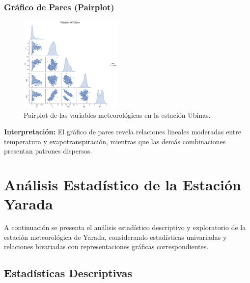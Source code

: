 \subsubsection*{Gráfico de Pares (Pairplot)}
\begin{figure}[H]
\centering
\includegraphics[width=0.45\textwidth]{resultados/por_estacion_meteorologica/Ubinas/pairplot.png}
\caption{Pairplot de las variables meteorológicas en la estación Ubinas.}
\label{fig:ubinas_pairplot}
\end{figure}
\textbf{Interpretación:} El gráfico de pares revela relaciones lineales moderadas entre temperatura y evapotranspiración, mientras que las demás combinaciones presentan patrones dispersos.


\section{Análisis Estadístico de la Estación Yarada}

A continuación se presenta el análisis estadístico descriptivo y exploratorio de la estación meteorológica de Yarada, considerando estadísticas univariadas y relaciones bivariadas con representaciones gráficas correspondientes.

\subsection{Estadísticas Descriptivas}

